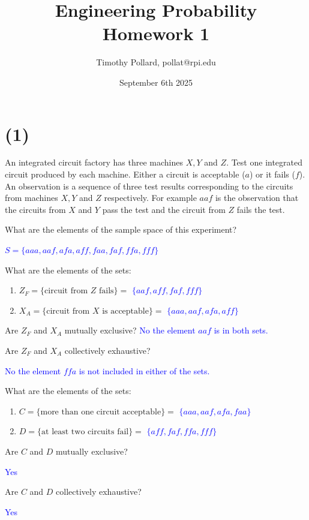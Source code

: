 \documentclass[12pt]{article}
\title{Engineering Probability \\ Homework 1}
\author{Timothy Pollard, pollat@rpi.edu}
\date{September 6th 2025}
\begin{document}
\maketitle
\hrulefill

\section*{(1)}
An integrated circuit factory has three machines $X, Y$ and $Z$. Test one
integrated circuit produced by each machine. Either a circuit is acceptable ($a$) or it
fails ($f$). An observation is a sequence of three test results corresponding to the circuits
from machines $X, Y$ and $Z$ respectively. For example $aaf$ is the observation that the
circuits from $X$ and $Y$ pass the test and the circuit from $Z$ fails the test.

\begin{enumerate}
    \item[a] What are the elements of the sample space of this experiment?
    \textcolor{blue}{\item[] $S=\{aaa,aaf,afa,aff,faa,faf,ffa,fff\}$}
    \item[b] What are the elements of the sets:
    \begin{enumerate}
        \item[] $Z_F = \{\text{circuit from } Z \text{ fails}\} =$ \textcolor{blue}{$\{aaf, aff, faf, fff\}$}
        \item[] $X_A = \{\text{circuit from } X \text{ is acceptable}\} =$ \textcolor{blue}{$\{aaa, aaf, afa, aff\}$}
    \end{enumerate}
    \item[c] Are \(Z_F\) and \(X_A\) mutually exclusive? \textcolor{blue}{ No the element $aaf$ is in both sets.}
    \item[d] Are \(Z_F\) and \(X_A\) collectively exhaustive? 
    \item[]\textcolor{blue}{ No the element $ffa$ is not included in either of the sets.} 
    \item[e] What are the elements of the sets:
    \begin{enumerate}
        \item[] $C = \{\text{more than one circuit acceptable}\} = $ \textcolor{blue}{$\{aaa, aaf, afa, faa\}$}
        \item[] $D = \{\text{at least two circuits fail}\} =$ \textcolor{blue}{$\{aff, faf, ffa, fff\}$}
    \end{enumerate}
    \item[f] Are \(C\) and \(D\) mutually exclusive?
    \item[] \textcolor{blue}{Yes}
    \item[g] Are \(C\) and \(D\) collectively exhaustive?
    \item[]\textcolor{blue}{Yes}
\end{enumerate}
\end{document}
